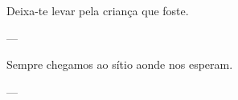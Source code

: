 \thispagestyle{empty}

\vspace*{\fill}

\epigraph{
  Deixa-te levar pela criança que foste.
}{---\textcite{saramago-2006}}

\epigraph{
  Sempre chegamos ao sítio aonde nos esperam.
}{---\textcite{saramago-2008}}

\vspace*{\fill}

\clearemptydoublepage
